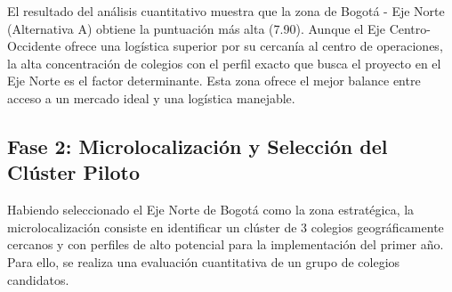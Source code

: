 \begin{table}[h!]
\centering
\caption{Matriz de Evaluación de Macrolocalización por Zonas de Influencia.}
\label{tab:macro_zonas}
\end{table}

El resultado del análisis cuantitativo muestra que la zona de Bogotá - Eje Norte (Alternativa A) obtiene la puntuación más alta (7.90). Aunque el Eje Centro-Occidente ofrece una logística superior por su cercanía al centro de operaciones, la alta concentración de colegios con el perfil exacto que busca el proyecto en el Eje Norte es el factor determinante. Esta zona ofrece el mejor balance entre acceso a un mercado ideal y una logística manejable.

\subsection*{Fase 2: Microlocalización y Selección del Clúster Piloto}

Habiendo seleccionado el Eje Norte de Bogotá como la zona estratégica, la microlocalización consiste en identificar un clúster de 3 colegios geográficamente cercanos y con perfiles de alto potencial para la implementación del primer año. Para ello, se realiza una evaluación cuantitativa de un grupo de colegios candidatos.

